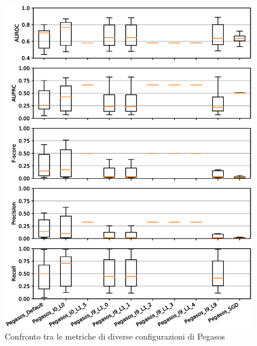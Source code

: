 \documentclass[12pt,a4paper,oneside,hidelinks]{report}
\begin{document}
\begin{figure}[hb]%
    \centering
    \includegraphics[scale = 0.80]{CC-Pegasos-level1.eps}%
    \caption{Confronto tra le metriche di diverse configurazioni di Pegasos}%
    \label{figure:liv1.3}%
\end{figure}

\vspace*{\fill}



\vspace*{\fill}
\end{document}
